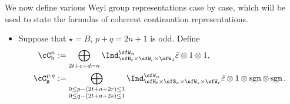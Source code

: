 \documentclass[12pt,a4paper]{amsart}
\newcommand{\sgn}{\operatorname{sgn}}
\numberwithin{equation}{section}
\theoremstyle{remark}
\def\brsgn{\breve{\sgn}}
\begin{document}
\medskip

We now define various Weyl group representations case by case, which will be used to
state the formulas of coherent continuation representations.
\begin{itemize}
  \item Suppose that $\star= B$, $p+q=2n+1$ is odd. Define
        \[
        \begin{split}
          \cC_{\mathrm b}^{n} & :=\bigoplus_{\substack{2t+c+d=n}} \Ind_{\sfH_{t} \times \sfW_{c}\times \sfW_{d}}^{\sfW_{n}}
         \tilde{\varepsilon}\otimes 1\otimes 1,\\
                   \cC_{\mathrm g}^{p,q}& :=\bigoplus_{\substack{0\leq p-(2t+a+2r)\leq 1\\0\leq q - (2t+a+2s)\leq 1}} \Ind_{\sfH_{t} \times \sfS_{a}\times \sfW_s\times \sfW_r}^{\sfW_{n}}
         \tilde{\varepsilon} \otimes 1 \otimes \sgn \otimes \sgn. \\
          \end{split}
        \]
   

        

\end{itemize}
\end{document}
